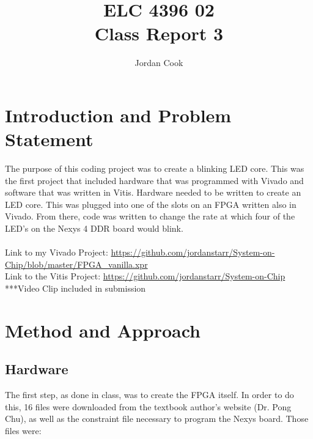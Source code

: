 \documentclass[11pt]{article}
\begin{document}
\title{ELC 4396 02 \\ Class Report 3}
\author{Jordan Cook}

\maketitle


\section{Introduction and Problem Statement} 

\quad The purpose of this coding project was to create a blinking LED core. This was the first project that included hardware that was programmed with Vivado and software that was written in Vitis. Hardware needed to be written to create an LED core. This was plugged into one of the slots on an FPGA written also in Vivado. From there, code was written to change the rate at which four of the LED's on the Nexys 4 DDR board would blink. 
\\\\ Link to my Vivado Project: \url{https://github.com/jordanstarr/System-on-Chip/blob/master/FPGA_vanilla.xpr}
\\ Link to the Vitis Project: \url{https://github.com/jordanstarr/System-on-Chip}
\\ ***Video Clip included in submission 

\section{Method and Approach}

\subsection{Hardware}

\quad The first step, as done in class, was to create the FPGA itself. In order to do this, 16 files were downloaded from the textbook author's website (Dr. Pong Chu), as well as the constraint file necessary to program the Nexys board. Those files were: 
\end{document}
